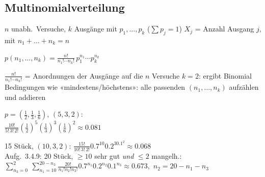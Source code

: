 \subsection{Multinomialverteilung}
\begin{merke}
\begin{itemize}
\pfeil $n$ unabh.\ Versuche, $k$ Ausgänge mit $p_1,\dots,p_k$ ($\sum p_j=1$)
\pfeil $X_j$ = Anzahl Ausgang $j$, mit $n_1+\dots+n_k=n$
\end{itemize}
\end{merke}
\begin{formel}
$\displaystyle p(n_1,\dots,n_k)=\frac{n!}{n_1!\cdots n_k!}\,p_1^{n_1}\cdots p_k^{n_k}$
\end{formel}
\begin{itemize}
\pfeil $\frac{n!}{n_1!\cdots n_k!}$ = Anordnungen der Ausgänge auf die $n$ Versuche
\pfeil $k=2$: ergibt Binomial
\pfeil Bedingungen wie «mindestens/höchstens»: alle passenden $(n_1,\dots,n_k)$ aufzählen und addieren
\end{itemize}
\begin{bsp}
$p=(\frac12,\frac13,\frac16)$, $(5,3,2)$:\\
$\frac{10!}{5!\,3!\,2!}(\frac12)^5(\frac13)^3(\frac16)^2\approx0.081$
\end{bsp}
\begin{bsp}
15 Stück, $(10,3,2)$: $\frac{15!}{10!\,3!\,2!}0.7^{10}0.2^30.1^2\approx0.068$\\
Aufg.\ 3.4.9: 20 Stück, $\ge10$ sehr gut \emph{und} $\le2$ mangelh.:\\
$\sum_{n_3=0}^{2}\ \sum_{n_1=10}^{20-n_3}\frac{20!}{n_1!n_2!n_3!}0.7^{n_1}0.2^{n_2}0.1^{n_3}\approx0.673$,\ $n_2=20-n_1-n_3$
\end{bsp}

